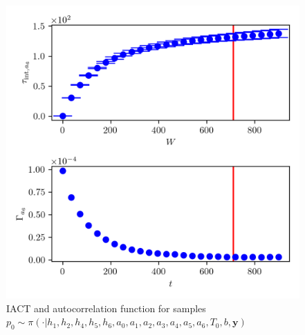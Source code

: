 \begin{figure}[ht!]
	\centering
	\includegraphics{UwerrTauIntTWalk17.png}
	\caption[IACT and autocorrelation function for $p_0$ samples]{IACT and autocorrelation function for samples $p_0 \sim \pi( \cdot | h_1,h_2,h_4,h_5,h_6,a_0,a_1,a_2,a_3,a_4,a_5,a_6,T_0,b, \bm{y})$}
	\label{fig:}
\end{figure}





